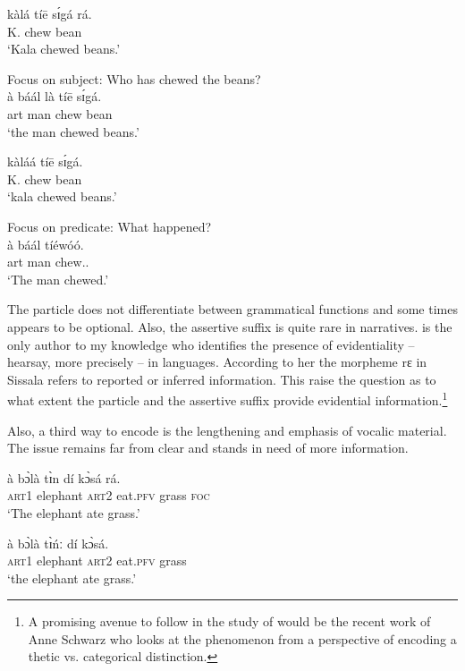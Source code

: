 \begin{exe}
\begin{exe}
\begin{exe}
\begin{exe}
\begin{exe}
\begin{exe}
\begin{exe}
\begin{exe}
\begin{exe}
\begin{exe}
\begin{exe}
\begin{exe}
\gll  kàlá tíē sɪ́gá rá.\\
   K.   chew bean {\foc}\\
\glt `Kala chewed {\sc beans}.'

\ex\label{ex:GRM-focus-subj}{\rm Focus on subject: Who has chewed the beans?}\\
\gll   à báál là  tíē sɪ́gá.\\
    {\sc art} man {\foc} chew bean\\
\glt `{\sc the man} chewed beans.'



\gll  kàláá tíē sɪ́gá.\\
   K.   chew bean\\
\glt `{\sc kala} chewed beans.'

\ex\label{ex:GRM-focus-pred}{\rm Focus on predicate: What happened?}\\
\gll à báál tíéwóó.\\
   {\sc art} man chew.{\pfv .\foc}\\
\glt `The man {\sc chewed}.'


\z 
 \z
 
 
The  particle does not differentiate between  grammatical functions and some times appears to be optional.  Also,  the assertive suffix is quite rare in narratives.  \citet[94]{blas90} is the only author to my knowledge who identifies the presence  of  evidentiality --  hearsay, more precisely -- in  languages. According to her the morpheme {\sls rɛ} in Sissala refers to reported or inferred information. This raise the question as to what extent the  particle and the assertive suffix provide evidential information.\footnote{A promising avenue to follow in the study of  would be the recent work of Anne Schwarz  who looks at the phenomenon from a perspective of encoding a thetic vs. categorical distinction.}

Also, a third way to encode  is the lengthening and emphasis of vocalic material. The issue remains far from clear and stands in need of more information.

\ea\label{ex:focus-length}

 
 \ea
\gll  à bɔ̀là tɪ̀n dí kɔ̀sá rá.\\
\textsc{art1}  elephant \textsc{art2} eat.\textsc{pfv} grass \textsc{foc}\\
\glt  `The elephant ate {\sc grass}.'

 \ex
\gll à bɔ̀là tɪ̀ńː    dí kɔ̀sá.\\
\textsc{art1} elephant \textsc{art2} eat.\textsc{pfv} grass \\
\glt  `{\sc the elephant} ate grass.'


\end{exe}
\end{exe}
\end{exe}
\end{exe}
\end{exe}
\end{exe}
\end{exe}
\end{exe}
\end{exe}
\end{exe}
\end{exe}
\end{exe}
